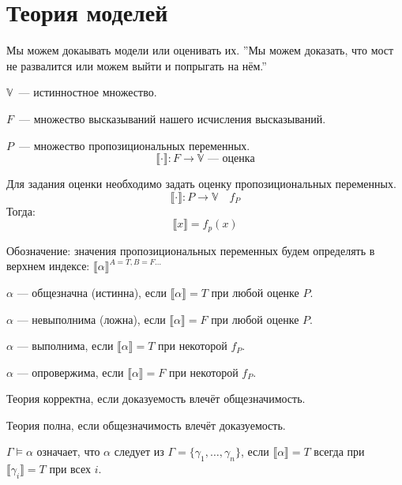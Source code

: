 \section{Теория моделей}
Мы можем докаывать модели или оценивать их.
''Мы можем доказать, что мост не развалится или можем выйти и попрыгать на нём.''

\begin{definition}
    $\mathbb{V}$~--- истинностное множество.

    $F$~--- множество высказываний нашего исчисления высказываний.

    $P$~--- множество пропозициональных переменных.
    \[ \llbracket\cdot\rrbracket: F \to \mathbb{V} \text{~--- оценка}\]
\end{definition}

\begin{definition}
    Для задания оценки необходимо задать оценку пропозициональных переменных.
    \[\llbracket \cdot \rrbracket : P\to \mathbb{V} \quad f_P\]
    Тогда:
    \[ \llbracket x \rrbracket = f_p(x)\]
\end{definition}

\begin{remark}
    Обозначение: значения пропозициональных переменных будем определять в верхнем индексе: $\llbracket \alpha \rrbracket ^{A = T, B = F \ldots}$
\end{remark}


\begin{definition}
    $\alpha$ --- общезначна (истинна), если $\llbracket \alpha \rrbracket = T$ при любой оценке $P$.

    $\alpha$ --- невыполнима (ложна), если $\llbracket \alpha \rrbracket = F$ при любой оценке $P$.

    $\alpha$ --- выполнима, если $\llbracket \alpha \rrbracket = T$ при некоторой $f_P$.

    $\alpha$ --- опровержима, если $\llbracket \alpha \rrbracket = F$ при некоторой $f_P$.
\end{definition}

\begin{definition}
    Теория корректна, если доказуемость влечёт общезначимость.

    Теория полна, если общезначимость влечёт доказуемость.
\end{definition}

\begin{definition}
    $\Gamma \vDash \alpha$ означает, что $\alpha$ следует из $\Gamma = \{ \gamma_1, \ldots, \gamma_n\}$, если $\llbracket \alpha \rrbracket = T$ всегда при $\llbracket \gamma_i \rrbracket = T$ при всех $i$.
\end{definition}

